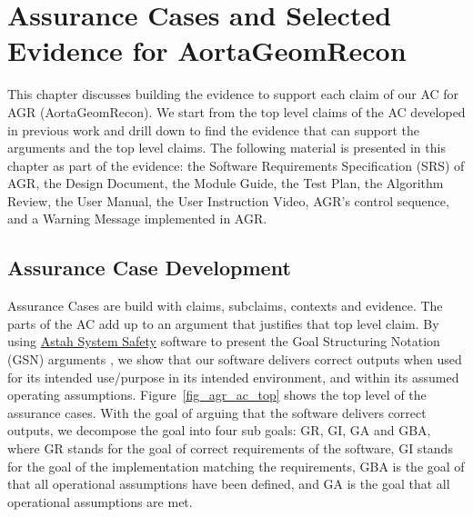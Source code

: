 \chapter{Assurance Cases and Selected Evidence for AortaGeomRecon}

This chapter discusses building the evidence to support each claim of our AC  for AGR (AortaGeomRecon). We start from the top level claims of the AC developed in previous work \cite{scs_ac} and drill down to find the evidence that can support the arguments and the top level claims. The following material is presented in this chapter as part of the evidence: the Software Requirements Specification (SRS) of AGR, the Design Document, the Module Guide, the Test Plan, the Algorithm Review,  the User Manual, the User Instruction Video, AGR's control sequence, and a Warning Message implemented in AGR.

\section{Assurance Case Development}

Assurance Cases are build with claims, subclaims, contexts and evidence. The parts of  the AC  add up  to an argument that justifies that top level claim. By using \href{https://astah.net/products/astah-system-safety/}{Astah System Safety} software to present the Goal Structuring Notation (GSN) arguments \cite{Astah_2023}\cite{kelly2004goal}, we show that our software delivers correct outputs when used for its intended use/purpose in its intended environment, and within its assumed operating assumptions. Figure~\ref{fig_agr_ac_top} shows the top level of the assurance cases. With the goal of arguing that the software delivers correct outputs, we decompose the goal into four sub goals: GR, GI, GA and GBA, where GR stands for the goal of correct requirements of the software, GI stands for the goal of the implementation  matching the requirements, GBA is the goal of  that all  operational assumptions have been defined, and GA is the goal that all operational assumptions are met.

